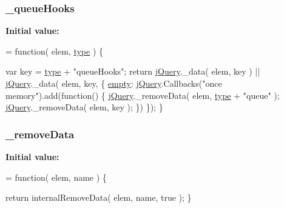 \subsubsection[{\+\_\+queue\+Hooks}]{ \+\_\+queue\+Hooks}\label{jquery-1_810_82-vsdoc_8js_ac896bda626b829bf9f8560a239e8f20b}
{\bfseries Initial value\+:}
\begin{DoxyCode}
= \textcolor{keyword}{function}( elem, \hyperlink{jquery-1_810_82-vsdoc_8js_a3940565e83a9bfd10d95ffd27536da91}{type} ) \{

        var key = \hyperlink{jquery-1_810_82-vsdoc_8js_a3940565e83a9bfd10d95ffd27536da91}{type} + \textcolor{stringliteral}{"queueHooks"};
        \textcolor{keywordflow}{return} \hyperlink{jquery-1_810_82-vsdoc_8js_add5237586d970a38a81f990e8eb28c6c}{jQuery}.\_data( elem, key ) || \hyperlink{jquery-1_810_82-vsdoc_8js_add5237586d970a38a81f990e8eb28c6c}{jQuery}.\_data( elem, key, \{
            \hyperlink{jquery-1_810_82-vsdoc_8js_ad242f812bdc5013e0cbf15d6e4d6800a}{empty}: \hyperlink{jquery-1_810_82-vsdoc_8js_add5237586d970a38a81f990e8eb28c6c}{jQuery}.Callbacks(\textcolor{stringliteral}{"once memory"}).add(\textcolor{keyword}{function}() \{
                \hyperlink{jquery-1_810_82-vsdoc_8js_add5237586d970a38a81f990e8eb28c6c}{jQuery}.\_removeData( elem, \hyperlink{jquery-1_810_82-vsdoc_8js_a3940565e83a9bfd10d95ffd27536da91}{type} + \textcolor{stringliteral}{"queue"} );
                \hyperlink{jquery-1_810_82-vsdoc_8js_add5237586d970a38a81f990e8eb28c6c}{jQuery}.\_removeData( elem, key );
            \})
        \});
    \}
\end{DoxyCode}
\hypertarget{jquery-1_810_82-vsdoc_8js_af9946bf86d7cfbcc033908182d2358a9}{}
\subsubsection[{\+\_\+remove\+Data}]{ \+\_\+remove\+Data}\label{jquery-1_810_82-vsdoc_8js_af9946bf86d7cfbcc033908182d2358a9}
{\bfseries Initial value\+:}
\begin{DoxyCode}
= \textcolor{keyword}{function}( elem, name ) \{

        \textcolor{keywordflow}{return} internalRemoveData( elem, name, \textcolor{keyword}{true} );
    \}
\end{DoxyCode}
\hypertarget{jquery-1_810_82-vsdoc_8js_a7d1dabc0af68f7b43c5cc81f1e61bf29}{}
